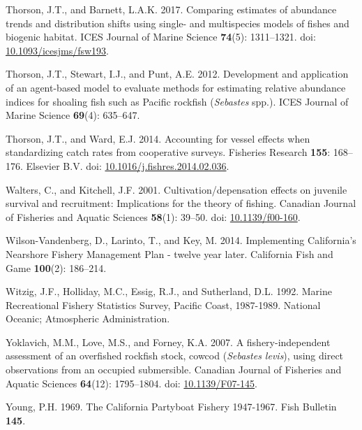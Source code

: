 \documentclass[11pt,
  english,
]{article}
\newlength{\cslhangindent}
\newenvironment{CSLReferences}[2] %
 {%
  \setlength{\parindent}{0pt}
  \ifodd #1 \everypar{\setlength{\hangindent}{\cslhangindent}}\ignorespaces\fi
  \ifnum #2 > 0
  \setlength{\parskip}{#2\baselineskip}
  \fi
 }%
 {}
\begin{document}
\begin{CSLReferences}{1}{0}
\leavevmode{}%
Thorson, J.T., and Barnett, L.A.K. 2017. {Comparing estimates of abundance trends and distribution shifts using single- and multispecies models of fishes and biogenic habitat}. ICES Journal of Marine Science \textbf{74}(5): 1311--1321. doi: \href{https://doi.org/10.1093/icesjms/fsw193}{10.1093/icesjms/fsw193}.

\leavevmode{}%
Thorson, J.T., Stewart, I.J., and Punt, A.E. 2012. {Development and application of an agent-based model to evaluate methods for estimating relative abundance indices for shoaling fish such as Pacific rockfish (\emph{Sebastes} spp.)}. ICES Journal of Marine Science \textbf{69}(4): 635--647.

\leavevmode{}%
Thorson, J.T., and Ward, E.J. 2014. {Accounting for vessel effects when standardizing catch rates from cooperative surveys}. Fisheries Research \textbf{155}: 168--176. Elsevier B.V. doi: \href{https://doi.org/10.1016/j.fishres.2014.02.036}{10.1016/j.fishres.2014.02.036}.

\leavevmode{}%
Walters, C., and Kitchell, J.F. 2001. {Cultivation/depensation effects on juvenile survival and recruitment: Implications for the theory of fishing}. Canadian Journal of Fisheries and Aquatic Sciences \textbf{58}(1): 39--50. doi: \href{https://doi.org/10.1139/f00-160}{10.1139/f00-160}.

\leavevmode{}%
Wilson-Vandenberg, D., Larinto, T., and Key, M. 2014. {Implementing California's Nearshore Fishery Management Plan - twelve year later}. California Fish and Game \textbf{100}(2): 186--214.

\leavevmode{}%
Witzig, J.F., Holliday, M.C., Essig, R.J., and Sutherland, D.L. 1992. {Marine Recreational Fishery Statistics Survey, Pacific Coast, 1987-1989}. National Oceanic; Atmospheric Administration.

\leavevmode{}%
Yoklavich, M.M., Love, M.S., and Forney, K.A. 2007. {A fishery-independent assessment of an overfished rockfish stock, cowcod (\emph{Sebastes levis}), using direct observations from an occupied submersible}. Canadian Journal of Fisheries and Aquatic Sciences \textbf{64}(12): 1795--1804. doi: \href{https://doi.org/10.1139/F07-145}{10.1139/F07-145}.

\leavevmode{}%
Young, P.H. 1969. {The California Partyboat Fishery 1947-1967}. Fish Bulletin \textbf{145}.

\end{CSLReferences}
\end{document}
